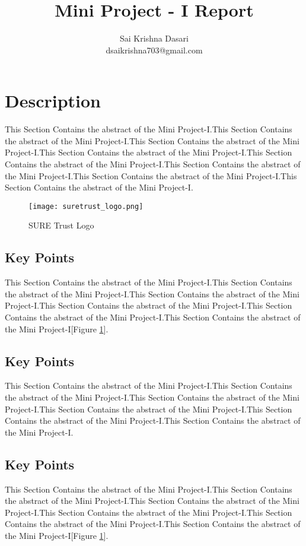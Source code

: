 \documentclass[12pt]{article}
\title{Mini Project - I Report}
\author{Sai Krishna Dasari\\dsaikrishna703@gmail.com}
\begin{document}
\maketitle %
\pagebreak
\tableofcontents %
\clearpage

\section{Description}

This Section Contains the abstract of the Mini Project-I.This Section Contains the abstract of the Mini Project-I.This Section Contains the abstract of the Mini Project-I.This Section Contains the abstract of the Mini Project-I.This Section Contains the abstract of the Mini Project-I.This Section Contains the abstract of the Mini Project-I.This Section Contains the abstract of the Mini Project-I.This Section Contains the abstract of the Mini Project-I.

\begin{figure}[h]
\centering
\texttt{[image: suretrust\_logo.png]}
\caption{SURE Trust Logo}
\label{fig_suretrustlogo}
\end{figure}

\subsection{Key Points}
This Section Contains the abstract of the Mini Project-I.This Section Contains the abstract of the Mini Project-I.This Section Contains the abstract of the Mini Project-I.This Section Contains the abstract of the Mini Project-I.This Section Contains the abstract of the Mini Project-I.This Section Contains the abstract of the Mini Project-I[Figure \ref{fig_suretrustlogo}].

\subsection{Key Points}
This Section Contains the abstract of the Mini Project-I.This Section Contains the abstract of the Mini Project-I.This Section Contains the abstract of the Mini Project-I.This Section Contains the abstract of the Mini Project-I.This Section Contains the abstract of the Mini Project-I.This Section Contains the abstract of the Mini Project-I.

\subsection{Key Points}
This Section Contains the abstract of the Mini Project-I.This Section Contains the abstract of the Mini Project-I.This Section Contains the abstract of the Mini Project-I.This Section Contains the abstract of the Mini Project-I.This Section Contains the abstract of the Mini Project-I.This Section Contains the abstract of the Mini Project-I[Figure \ref{fig_suretrustlogo}].
\end{document}
